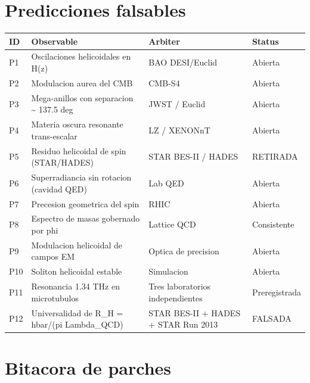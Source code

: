 ﻿\documentclass[11pt,letterpaper]{article}
\begin{document}
\newpage
\section*{Predicciones falsables}

\begin{longtable}{@{}p{0.8cm}p{5.5cm}p{3.5cm}p{2.5cm}@{}}
\toprule
\textbf{ID} & \textbf{Observable} & \textbf{Arbiter} & \textbf{Status} \\
\midrule
\endhead
P1 & Oscilaciones helicoidales en H(z) & BAO DESI/Euclid & Abierta \\
P2 & Modulacion aurea del CMB & CMB-S4 & Abierta \\
P3 & Mega-anillos con separacion \textasciitilde{} 137.5 deg & JWST / Euclid & Abierta \\
P4 & Materia oscura resonante trans-escalar & LZ / XENONnT & Abierta \\
P5 & Residuo helicoidal de spin (STAR/HADES) & STAR BES-II / HADES & RETIRADA \\
P6 & Superradiancia sin rotacion (cavidad QED) & Lab QED & Abierta \\
P7 & Precesion geometrica del spin & RHIC & Abierta \\
P8 & Espectro de masas gobernado por phi & Lattice QCD & Consistente \\
P9 & Modulacion helicoidal de campos EM & Optica de precision & Abierta \\
P10 & Soliton helicoidal estable & Simulacion & Abierta \\
P11 & Resonancia 1.34 THz en microtubulos & Tres laboratorios independientes & Preregistrada \\
P12 & Universalidad de R\_H = hbar/(pi Lambda\_QCD) & STAR BES-II + HADES + STAR Run 2013 & FALSADA \\
\bottomrule
\end{longtable}

\newpage
\section{Bitacora de parches}
\end{document}

